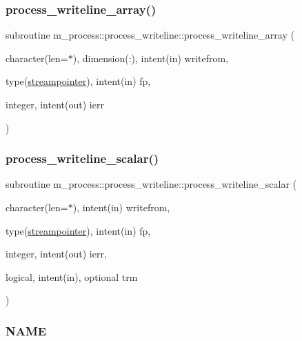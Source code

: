 \subsubsection{\texorpdfstring{process\+\_\+writeline\+\_\+array()}{process\_writeline\_array()}}
{\footnotesize\ttfamily subroutine m\+\_\+process\+::process\+\_\+writeline\+::process\+\_\+writeline\+\_\+array (\begin{DoxyParamCaption}\item[{character(len=$\ast$), dimension(\+:), intent(in)}]{writefrom,  }\item[{type(\mbox{\hyperlink{structm__process_1_1streampointer}{streampointer}}), intent(in)}]{fp,  }\item[{integer, intent(out)}]{ierr }\end{DoxyParamCaption})\hspace{0.3cm}{\ttfamily [private]}}

\mbox{\label{interfacem__process_1_1process__writeline_a9e95166556bec54fd10568f01d02f34e}} 
\subsubsection{\texorpdfstring{process\+\_\+writeline\+\_\+scalar()}{process\_writeline\_scalar()}}
{\footnotesize\ttfamily subroutine m\+\_\+process\+::process\+\_\+writeline\+::process\+\_\+writeline\+\_\+scalar (\begin{DoxyParamCaption}\item[{character(len=$\ast$), intent(in)}]{writefrom,  }\item[{type(\mbox{\hyperlink{structm__process_1_1streampointer}{streampointer}}), intent(in)}]{fp,  }\item[{integer, intent(out)}]{ierr,  }\item[{logical, intent(in), optional}]{trm }\end{DoxyParamCaption})\hspace{0.3cm}{\ttfamily [private]}}



\subsubsection*{N\+A\+ME}

